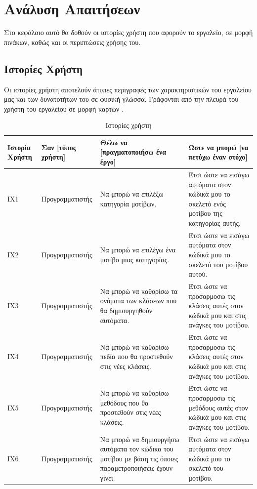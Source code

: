 \chapter{Ανάλυση Απαιτήσεων}
Στο κεφάλαιο αυτό θα δοθούν οι ιστορίες χρήστη που αφορούν το εργαλείο, σε μορφή πινάκων, καθώς  και οι περιπτώσεις χρήσης του.

\label{ch:requirmentAnalysis}
\section{Ιστορίες Χρήστη}
\label{sec:userStories}
Οι ιστορίες χρήστη αποτελούν άτυπες περιγραφές  των χαρακτηριστικών του εργαλείου μας και των δυνατοτήτων του σε φυσική γλώσσα. 
Γράφονται από την πλευρά του χρήστη του εργαλείου σε μορφή καρτών \cite{SWEBOK}.
\begin{table}[H]
	\hspace*{-0.2cm}
    \centering
    \scriptsize
    \caption{Ιστορίες χρήστη}
    \label{tab:userStories}
	\begin{tabular}{|p{1.5cm}|p{3.5cm}|p{4.5cm}|p{4.7cm}|}
    \hline
        \textbf{Ιστορία Χρήστη} & \textbf{Σαν [τύπος χρήστη]} & \textbf{Θέλω να [πραγματοποιήσω ένα έργο]} & \textbf{Ώστε να μπορώ [να πετύχω έναν στόχο]} \\ \hline     \hline
        ΙΧ1 & Προγραμματιστής & Να μπορώ να επιλέξω κατηγορία μοτίβων. & Έτσι ώστε να εισάγω αυτόματα στον κώδικά μου το σκελετό ενός μοτίβου της κατηγορίας αυτής. \\ \hline
        ΙΧ2 & Προγραμματιστής & Να μπορώ να επιλέγω ένα μοτίβο μιας κατηγορίας. & Έτσι ώστε να  εισάγω αυτόματα στον κώδικά μου το σκελετό του μοτίβου αυτού. \\ \hline
        ΙΧ3 & Προγραμματιστής & Να μπορώ να καθορίσω τα ονόματα των κλάσεων που θα δημιουργηθούν αυτόματα. & Έτσι ώστε να προσαρμοσω τις κλάσεις αυτές στον κώδικά μου και στις ανάγκες του μοτίβου. \\ \hline
        ΙΧ4 & Προγραμματιστής & Να μπορώ να καθορίσω πεδία που θα προστεθούν στις νέες κλάσεις.  & Έτσι ώστε να προσαρμοσω τις κλάσεις αυτές στον κώδικά μου και στις ανάγκες του μοτίβου. \\ \hline
        ΙΧ5 & Προγραμματιστής & Να μπορώ να καθορίσω μεθόδους που θα προστεθούν στις νέες κλάσεις. & Έτσι ώστε να προσαρμοσω τις μεθόδους αυτές στον κώδικά μου και στις ανάγκες του μοτίβου. \\ \hline
        ΙΧ6 & Προγραμματιστής & Να μπορώ να δημιουργήσω αυτόματα τον κώδικα του μοτίβου με βάση τις όποιες παραμετροποιήσεις έχουν γίνει. & Έτσι ώστε να εισάγω αυτόματα στον κώδικά μου το σκελετό του μοτίβου. \\ \hline

\end{tabular}
\end{table}
